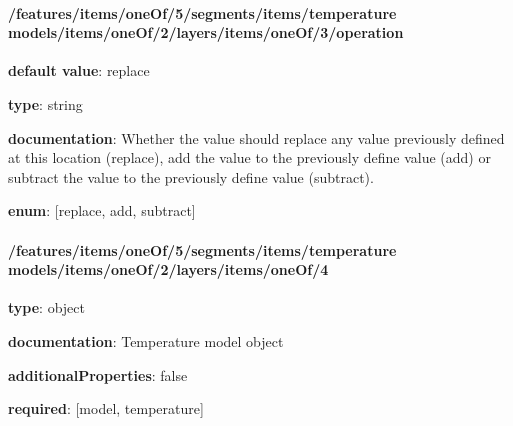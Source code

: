 \begin{itemized}
\end{itemized}\paragraph{/features/items/oneOf/5/segments/items/temperature models/items/oneOf/2/layers/items/oneOf/3/operation} \begin{itemized}
\item {\bf default value}: replace
\item {\bf type}: string
\item {\bf documentation}: Whether the value should replace any value previously defined at this location (replace), add the value to the previously define value (add) or subtract the value to the previously define value (subtract).
\item {\bf enum}: [replace, add, subtract]\end{itemized}\paragraph{/features/items/oneOf/5/segments/items/temperature models/items/oneOf/2/layers/items/oneOf/4} \begin{itemized}
\item {\bf type}: object
\item {\bf documentation}: Temperature model object
\item {\bf additionalProperties}: false
\item {\bf required}: [model, temperature]\end{itemized}
